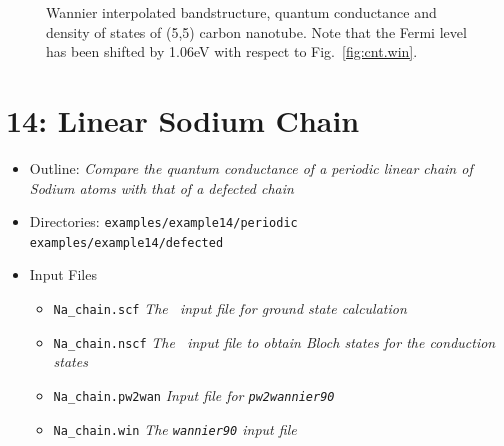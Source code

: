 \documentclass[a4paper,11pt,twoside]{article}
\begin{document}
\begin{figure}[h]
\begin{center}
\caption{Wannier interpolated bandstructure, quantum conductance and
density of states of (5,5) carbon nanotube. Note that the Fermi level has been shifted 
by 1.06eV with respect to Fig.~\ref{fig:cnt.win}.}
\label{fig:cnt.tran}
\end{center}
\end{figure}

\cleardoublepage

\section*{14: Linear Sodium Chain}

\begin{itemize}
  \item{Outline: \it{Compare the quantum conductance of a periodic 
  	linear chain of Sodium atoms with that of a defected chain}}
  \item{\begin{tabbing}
  Directories: \= {\tt examples/example14/periodic}\\ 
    				 \> {\tt examples/example14/defected}
    		\end{tabbing}}
  \item{Input Files}
    \begin{itemize}
      \item{ {\tt Na\_chain.scf}  {\it The \pwscf\ input file for ground state
	  calculation}}
      \item{ {\tt Na\_chain.nscf}  {\it The \pwscf\ input file to obtain Bloch
	  states for the conduction states}} 
      \item{ {\tt Na\_chain.pw2wan}  {\it Input file for {\tt pw2wannier90}}}
      \item{ {\tt Na\_chain.win}  {\it The {\tt wannier90} input file}}
    \end{itemize}
\end{itemize}
\end{document}
